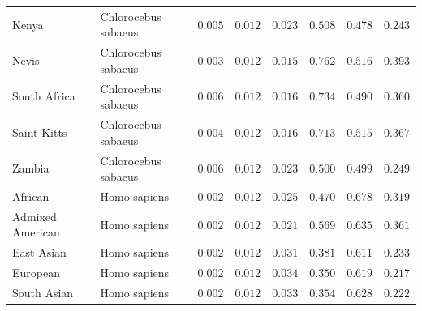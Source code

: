 \documentclass{article}
\begin{document}
\begin{center}
\begin{longtable*}{|l|l|r|r|r|r|r|r|}
             Kenya & Chlorocebus sabaeus &               $ 0.005$ &              $ 0.012$ &              $ 0.023$ &                                          $ 0.508$ &                         $ 0.478$ &                      $ 0.243$ \\
             Nevis & Chlorocebus sabaeus &               $ 0.003$ &              $ 0.012$ &              $ 0.015$ &                                          $ 0.762$ &                         $ 0.516$ &                      $ 0.393$ \\
             South Africa  & Chlorocebus sabaeus &               $ 0.006$ &              $ 0.012$ &              $ 0.016$ &                                          $ 0.734$ &                         $ 0.490$ &                      $ 0.360$ \\
             Saint Kitts & Chlorocebus sabaeus &               $ 0.004$ &              $ 0.012$ &              $ 0.016$ &                                          $ 0.713$ &                         $ 0.515$ &                      $ 0.367$ \\
             Zambia & Chlorocebus sabaeus &               $ 0.006$ &              $ 0.012$ &              $ 0.023$ &                                          $ 0.500$ &                         $ 0.499$ &                      $ 0.249$ \\
            African &        Homo sapiens &               $ 0.002$ &              $ 0.012$ &              $ 0.025$ &                                          $ 0.470$ &                         $ 0.678$ &                      $ 0.319$ \\
            Admixed American &        Homo sapiens &               $ 0.002$ &              $ 0.012$ &              $ 0.021$ &                                          $ 0.569$ &                         $ 0.635$ &                      $ 0.361$ \\
            East Asian &        Homo sapiens &               $ 0.002$ &              $ 0.012$ &              $ 0.031$ &                                          $ 0.381$ &                         $ 0.611$ &                      $ 0.233$ \\
            European &        Homo sapiens &               $ 0.002$ &              $ 0.012$ &              $ 0.034$ &                                          $ 0.350$ &                         $ 0.619$ &                      $ 0.217$ \\
            South Asian &        Homo sapiens &               $ 0.002$ &              $ 0.012$ &              $ 0.033$ &                                          $ 0.354$ &                         $ 0.628$ &                      $ 0.222$ \\
        \end{longtable*}
    \end{center}
\end{document}
